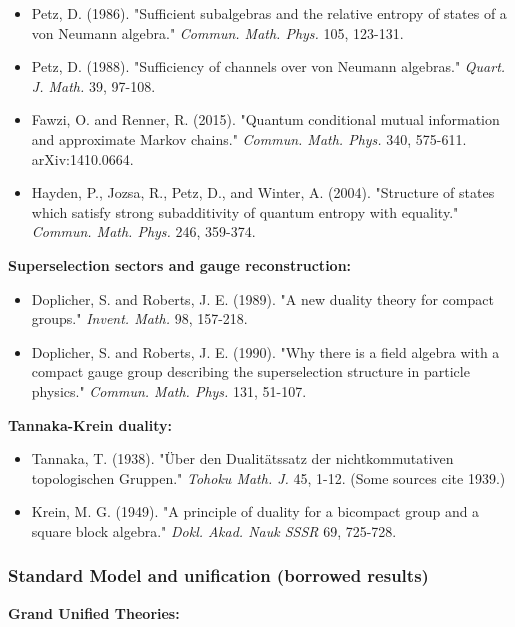 \begin{itemize}
\tightlist
\item
  Petz, D. (1986). "Sufficient subalgebras and the relative entropy of states of a von Neumann algebra." \emph{Commun. Math. Phys.} 105, 123-131.
\item
  Petz, D. (1988). "Sufficiency of channels over von Neumann algebras." \emph{Quart. J. Math.} 39, 97-108.
\item
  Fawzi, O. and Renner, R. (2015). "Quantum conditional mutual information and approximate Markov chains." \emph{Commun. Math. Phys.} 340, 575-611. arXiv:1410.0664.
\item
  Hayden, P., Jozsa, R., Petz, D., and Winter, A. (2004). "Structure of states which satisfy strong subadditivity of quantum entropy with equality." \emph{Commun. Math. Phys.} 246, 359-374.
\end{itemize}

\textbf{Superselection sectors and gauge reconstruction:}

\begin{itemize}
\tightlist
\item
  Doplicher, S. and Roberts, J. E. (1989). "A new duality theory for compact groups." \emph{Invent. Math.} 98, 157-218.
\item
  Doplicher, S. and Roberts, J. E. (1990). "Why there is a field algebra with a compact gauge group describing the superselection structure in particle physics." \emph{Commun. Math. Phys.} 131, 51-107.
\end{itemize}

\textbf{Tannaka-Krein duality:}

\begin{itemize}
\tightlist
\item
  Tannaka, T. (1938). "\"{U}ber den Dualit\"{a}tssatz der nichtkommutativen topologischen Gruppen." \emph{Tohoku Math. J.} 45, 1-12. (Some sources cite 1939.)
\item
  Krein, M. G. (1949). "A principle of duality for a bicompact group and a square block algebra." \emph{Dokl. Akad. Nauk SSSR} 69, 725-728.
\end{itemize}

\subsubsection{Standard Model and unification (borrowed results)}\label{standard-model-and-unification-borrowed-results}

\textbf{Grand Unified Theories:}


